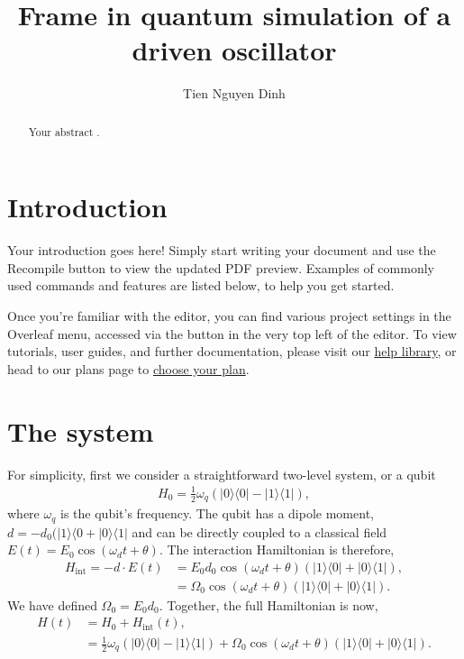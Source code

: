 \documentclass{article}
\title{Frame in quantum simulation of a driven oscillator}
\author{Tien Nguyen Dinh}
\begin{document}
\maketitle

\begin{abstract}
Your abstract \cite{greenwade93}.
\end{abstract}

\section{Introduction}

Your introduction goes here! Simply start writing your document and use the Recompile button to view the updated PDF preview. Examples of commonly used commands and features are listed below, to help you get started.

Once you're familiar with the editor, you can find various project settings in the Overleaf menu, accessed via the button in the very top left of the editor. To view tutorials, user guides, and further documentation, please visit our \href{https://www.overleaf.com/learn}{help library}, or head to our plans page to \href{https://www.overleaf.com/user/subscription/plans}{choose your plan}.

\section{The system}

For simplicity, first we consider a straightforward two-level system, or a qubit
\begin{align}
    H_0 = \frac{1}{2}\omega_q(|0\rangle\langle 0|-|1\rangle\langle 1|),
\end{align}
where $\omega_q$ is the qubit's frequency. The qubit has a dipole moment, $d=-d_0(|1\rangle\langle 0+|0\rangle\langle 1|$ and can be directly coupled to a classical field $E(t)=E_0\cos(\omega_d t + \theta)$. The interaction Hamiltonian is therefore,
\begin{align}
    H_{\text{int}}= -d\cdot E(t) &= E_0d_0\cos(\omega_d t + \theta)(|1\rangle\langle 0|+|0\rangle\langle 1|),\\
    &=\Omega_0\cos(\omega_d t +\theta)(|1\rangle\langle 0|+|0\rangle\langle 1|). 
\end{align}
We have defined $\Omega_0=E_0 d_0$. Together, the full Hamiltonian is now,
\begin{align}\label{fullH}
    H(t) &= H_0+H_{\text{int}}(t),\\
    &=\frac{1}{2}\omega_q(|0\rangle\langle 0|-|1\rangle\langle 1|)+\Omega_0\cos(\omega_d t+\theta)(|1\rangle\langle 0|+|0\rangle\langle 1|).
\end{align}
\end{document}
